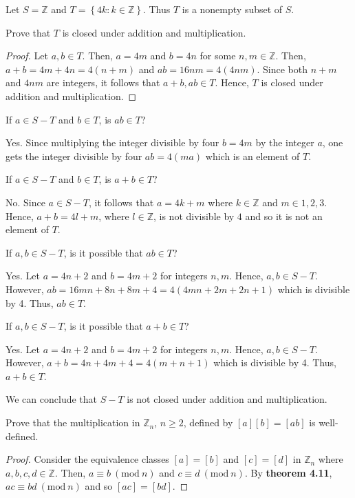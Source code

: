\documentclass[12pt]{article}
\newcommand{\Z}{\mathbb{Z}}
\newcommand{\Mod}[1]{\ (\mathrm{mod}\ #1)}
\newenvironment{problem}[2][Problem]{\begin{trivlist} \item[\hskip \labelsep {\bfseries #1}\hskip \labelsep {\bfseries #2.}]}{\end{trivlist}}
\newenvironment{solution}[2][Solution]{\begin{trivlist} \item[\hskip \labelsep {\bfseries #1}\hskip \labelsep {\bfseries #2.}]}{\end{trivlist}}
\begin{document}
   \begin{problem}{57}
     Let $S=\Z$ and $T=\left\{ 4k:k\in\Z \right\}$. Thus $T$ is a nonempty subset of $S$.
     \begin{enumerate}[label=(\alph*)]
       \item Prove that $T$ is closed under addition and multiplication.
	 \begin{proof}
	   Let $a,b\in T$. Then, $a=4m$ and $b=4n$ for some $n,m\in \Z$. Then, $a+b = 4m+4n=4(n+m)$ and $ab = 16nm= 4(4nm)$. Since both $n+m$ and $4nm$ are integers, it follows that $a+b,ab\in T$. Hence, $T$ is closed under addition and multiplication.
	 \end{proof}
	\item If $a\in S-T$ and $b\in T$, is $ab\in T$?
	  \begin{solution}{(b)}
	    Yes. Since multiplying the integer divisible by four $b=4m$ by the integer $a$, one gets the integer divisible by four $ab=4(ma)$ which is an element of $T$.
	  \end{solution}
	\item If $a\in S-T$ and $b\in T$, is $a+b\in T$?
	  \begin{solution}{(c)}
	    No. Since $a\in S-T$, it follows that $a=4k+m$ where $k\in\Z$ and $m\in{1,2,3}$. Hence, $a+b=4l+m$, where $l\in \Z$, is not divisible by $4$ and so it is not an element of $T$.
	  \end{solution}
	\item If $a,b\in S-T$, is it possible that $ab \in T$?
	  \begin{solution}{(d)}
	    Yes. Let $a=4n+2$ and $b=4m+2$ for integers $n,m$. Hence, $a,b\in S-T$. However, $ab = 16mn + 8n + 8m +4 = 4(4mn+2m+2n+1)$ which is divisible by 4. Thus, $ab\in T$. 
	  \end{solution}
	 \item If $a,b\in S-T$, is it possible that $a+b\in T$?
	   \begin{solution}{(e)}
	     Yes. Let $a=4n+2$ and $b=4m+2$ for integers $n,m$. Hence, $a,b\in S-T$. However, $a+b = 4n+4m+4 = 4(m+n+1)$ which is divisible by 4. Thus, $a+b\in T$.
	   \end{solution}
We can conclude that $S-T$ is not closed under addition and multiplication.
     \end{enumerate}
   \end{problem}

   \begin{problem}{58}
     Prove that the multiplication in $\Z_{n}$, $n\geq 2$, defined by $[a][b]=[ab]$ is well-defined.
     \begin{proof}
       Consider the equivalence classes $[a]=[b]$ and $[c]=[d]$ in $\Z_{n}$ where $a,b,c,d\in \Z$. Then, $a\equiv b \Mod n$ and $c\equiv d \Mod n$. By \textbf{theorem 4.11}, $ac \equiv bd \Mod n$ and so $[ac]=[bd]$.
     \end{proof}
   \end{problem}
   
\end{document}
